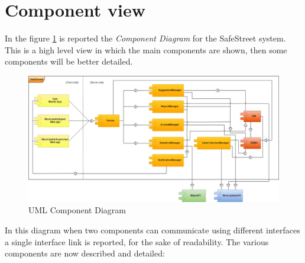 \documentclass[a4paper]{report}
\begin{document}
\section{Component view}
In the figure \ref{fig:component-diagram} is reported the \textit{Component Diagram} for the SafeStreet system. This is a high level view in which the main components are shown, then some components will be better detailed.

\begin{landscape}

\begin{figure}[hp]
\includegraphics[angle=0, scale=0.55]{Component1}
\caption{UML Component Diagram}
\label{fig:component-diagram}
\end{figure}

\end{landscape}
\restoregeometry
In this diagram when two components can communicate using different interfaces a single interface link is 
reported, for the sake of readability. The various components are now described and detailed:
\end{document}
